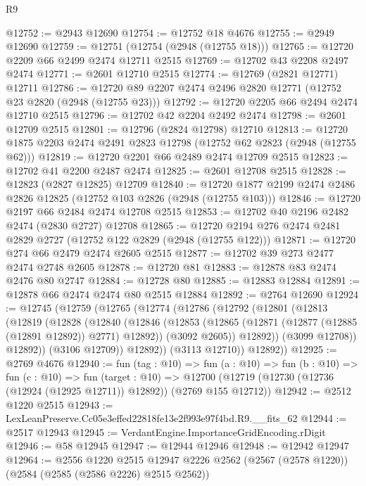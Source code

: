 \begin{lexlean}{R9}
\begin{coremodule}
@12752 := @2943 @12690
@12754 := @12752 @18 @4676
@12755 := @2949 @12690
@12759 := @12751 (@12754 (@2948 (@12755 @18)))
@12765 := @12720 @2209 @66 @2499 @2474 @12711 @2515
@12769 := @12702 @43 @2208 @2497 @2474
@12771 := @2601 @12710 @2515
@12774 := @12769 (@2821 @12771) @12711
@12786 := @12720 @89 @2207 @2474 @2496 @2820 @12771 (@12752 @23 @2820 (@2948 (@12755 @23)))
@12792 := @12720 @2205 @66 @2494 @2474 @12710 @2515
@12796 := @12702 @42 @2204 @2492 @2474
@12798 := @2601 @12709 @2515
@12801 := @12796 (@2824 @12798) @12710
@12813 := @12720 @1875 @2203 @2474 @2491 @2823 @12798 (@12752 @62 @2823 (@2948 (@12755 @62)))
@12819 := @12720 @2201 @66 @2489 @2474 @12709 @2515
@12823 := @12702 @41 @2200 @2487 @2474
@12825 := @2601 @12708 @2515
@12828 := @12823 (@2827 @12825) @12709
@12840 := @12720 @1877 @2199 @2474 @2486 @2826 @12825 (@12752 @103 @2826 (@2948 (@12755 @103)))
@12846 := @12720 @2197 @66 @2484 @2474 @12708 @2515
@12853 := @12702 @40 @2196 @2482 @2474 (@2830 @2727) @12708
@12865 := @12720 @2194 @276 @2474 @2481 @2829 @2727 (@12752 @122 @2829 (@2948 (@12755 @122)))
@12871 := @12720 @274 @66 @2479 @2474 @2605 @2515
@12877 := @12702 @39 @273 @2477 @2474 @2748 @2605
@12878 := @12720 @81
@12883 := @12878 @83 @2474 @2476 @80 @2747
@12884 := @12728 @80
@12885 := @12883 @12884
@12891 := @12878 @66 @2474 @2474 @80 @2515 @12884
@12892 := @2764 @12690
@12924 := @12745
    (@12759
      (@12765
        (@12774
          (@12786
            (@12792
              (@12801
                (@12813
                  (@12819
                    (@12828
                      (@12840
                        (@12846
                          (@12853
                            (@12865 (@12871 (@12877 (@12885 (@12891 @12892)) @2771) @12892))
                            (@3092 @2605))
                          @12892))
                      (@3099 @12708))
                    @12892))
                (@3106 @12709))
              @12892))
          (@3113 @12710))
        @12892))
@12925 := @2769 @4676
@12940 := fun (tag : @10) =>
  fun (a : @10) =>
  fun (b : @10) =>
  fun (c : @10) =>
  fun (target : @10) =>
  @12700 (@12719 (@12730 (@12736 (@12924 (@12925 @12711)) @12892)) (@2769 @155 @12712))
@12942 := @2512 @1220 @2515
@12943 := LexLeanPreserve.Cc05e3effed22818fe13e2f993e97f4bd.R9.__fits_62
@12944 := @2517 @12943
@12945 := VerdantEngine.ImportanceGridEncoding.rDigit
@12946 := @58 @12945
@12947 := @12944 @12946
@12948 := @12942 @12947
@12964 := @2556
    @1220
    @2515
    @12947
    @2226
    @2562
    (@2567 (@2578 @1220))
    (@2584 (@2585 (@2586 @2226) @2515 @2562))

\end{coremodule}
\end{lexlean}
